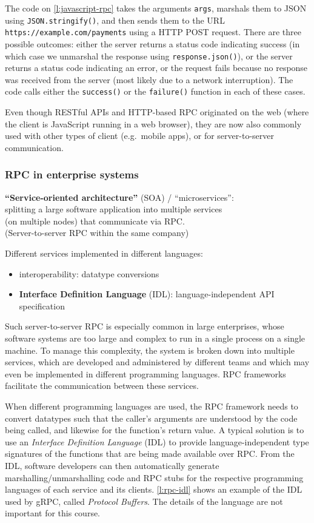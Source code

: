 The code on \autoref{l:javascript-rpc} takes the arguments \verb|args|, marshals them to JSON using \verb|JSON.stringify()|, and then sends them to the URL \verb|https://example.com/payments| using a HTTP POST request.
There are three possible outcomes: either the server returns a status code indicating success (in which case we unmarshal the response using \verb|response.json()|), or the server returns a status code indicating an error, or the request fails because no response was received from the server (most likely due to a network interruption).
The code calls either the \verb|success()| or the \verb|failure()| function in each of these cases.

Even though RESTful APIs and HTTP-based RPC originated on the web (where the client is JavaScript running in a web browser), they are now also commonly used with other types of client (e.g.\ mobile apps), or for server-to-server communication.

\begin{frame}
    \label{s:rpc-discussion}
    \frametitle{RPC in enterprise systems}
    \textbf{``Service-oriented architecture''} (SOA) / ``microservices'':\\[1em]
    splitting a large software application into multiple services\\ (on multiple nodes) that communicate via RPC.\\[1em]
    (Server-to-server RPC within the same company)\\[1.5em]\pause

    Different services implemented in different languages:
    \begin{itemize}
        \item interoperability: datatype conversions
        \item \textbf{Interface Definition Language} (IDL): language-independent API specification
    \end{itemize}
\end{frame}

Such server-to-server RPC is especially common in large enterprises, whose software systems are too large and complex to run in a single process on a single machine.
To manage this complexity, the system is broken down into multiple services, which are developed and administered by different teams and which may even be implemented in different programming languages.
RPC frameworks facilitate the communication between these services.

When different programming languages are used, the RPC framework needs to convert datatypes such that the caller's arguments are understood by the code being called, and likewise for the function's return value.
A typical solution is to use an \emph{Interface Definition Language} (IDL) to provide language-independent type signatures of the functions that are being made available over RPC.
From the IDL, software developers can then automatically generate marshalling/unmarshalling code and RPC stubs for the respective programming languages of each service and its clients.
\autoref{l:rpc-idl} shows an example of the IDL used by gRPC, called \emph{Protocol Buffers}.
The details of the language are not important for this course.

